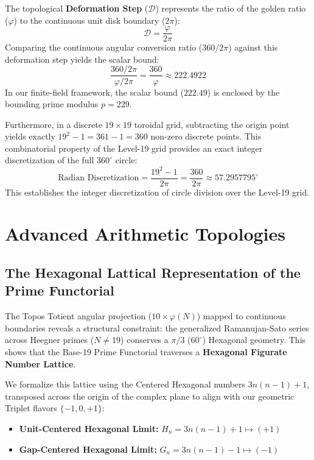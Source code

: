 The topological \textbf{Deformation Step} ($\mathcal{D}$) represents the ratio of the golden ratio ($\varphi$) to the continuous unit disk boundary ($2\pi$):
\begin{equation}
\mathcal{D} = \frac{\varphi}{2\pi}
\end{equation}
Comparing the continuous angular conversion ratio ($360 / 2\pi$) against this deformation step yields the scalar bound:
\begin{equation}
\frac{360 / 2\pi}{\varphi / 2\pi} = \frac{360}{\varphi} \approx 222.4922
\end{equation}
In our finite-field framework, the scalar bound ($222.49$) is enclosed by the bounding prime modulus $p = 229$.

Furthermore, in a discrete $19 \times 19$ toroidal grid, subtracting the origin point yields exactly $19^2 - 1 = 361 - 1 = 360$ non-zero discrete points. This combinatorial property of the Level-19 grid provides an exact integer discretization of the full $360^\circ$ circle:
\begin{equation}
\text{Radian Discretization} = \frac{19^2 - 1}{2\pi} = \frac{360}{2\pi} \approx 57.2957795^\circ
\end{equation}
This establishes the integer discretization of circle division over the Level-19 grid.

\section{Advanced Arithmetic Topologies}
\subsection{The Hexagonal Lattical Representation of the Prime Functorial}
The Topos Totient angular projection ($10 \times \varphi(N)$) mapped to continuous boundaries reveals a structural constraint: the generalized Ramanujan-Sato series across Heegner primes ($N \neq 19$) conserves a $\pi/3$ ($60^\circ$) Hexagonal geometry. This shows that the Base-19 Prime Functorial traverses a \textbf{Hexagonal Figurate Number Lattice}.

We formalize this lattice using the Centered Hexagonal numbers $3n(n-1) + 1$, transposed across the origin of the complex plane to align with our geometric Triplet flavors $\{-1, 0, +1\}$:
\begin{itemize}
    \item \textbf{Unit-Centered Hexagonal Limit:} $H_n = 3n(n-1) + 1 \mapsto (+1)$
    \item \textbf{Gap-Centered Hexagonal Limit:} $G_n = 3n(n-1) - 1 \mapsto (-1)$
\end{itemize}

